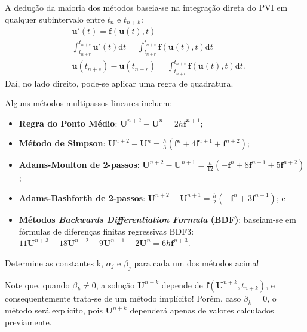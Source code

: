 \documentclass[../differential_methods.tex]{subfiles}
\begin{document}
A dedução da maioria dos métodos baseia-se na integração direta do PVI em qualquer subintervalo entre \(t_{n}\) e \(t_{n+k}\):
\begin{align*}
	 & \mathbf{u}'(t) = \mathbf{f}(\mathbf{u}(t), t)                                                                         \\
	 & \int_{t_{n+r}}^{t_{n+s}}\mathbf{u}'(t) \mathrm{d}t = \int_{t_{n+r}}^{t_{n+s}}\mathbf{f}(\mathbf{u}(t), t) \mathrm{d}t \\
	 & \mathbf{u}(t_{n+s}) - \mathbf{u}(t_{n+r}) = \int_{t_{n+r}}^{t_{n+s}}\mathbf{f}(\mathbf{u}(t), t) \mathrm{d}t.
\end{align*}
Daí, no lado direito, pode-se aplicar uma regra de quadratura.
\begin{example}
	Alguns métodos multipassos lineares incluem:
	\begin{itemize}
		\item \textbf{Regra do Ponto Médio}: \(\mathbf{U}^{n+2} - \mathbf{U}^{n} = 2h \mathbf{f}^{n+1}\);
		\item \textbf{Método de Simpson}: \(\displaystyle \mathbf{U}^{n+2} - \mathbf{U}^{n} = \frac{h}{3}(\mathbf{f}^{n} + 4 \mathbf{f}^{n+1} + \mathbf{f}^{n+2})\);
		\item \textbf{Adams-Moulton de 2-passos}: \(\displaystyle \mathbf{U}^{n+2} - \mathbf{U}^{n+1} = \frac{h}{12}(-\mathbf{f}^{n} + 8 \mathbf{f}^{n+1} + 5 \mathbf{f}^{n+2})\);
		\item \textbf{Adams-Bashforth de 2-passos}: \(\displaystyle \mathbf{U}^{n+2} - \mathbf{U}^{n+1} = \frac{h}{2}(-\mathbf{f}^{n} + 3 \mathbf{f}^{n+1})\); e
		\item \textbf{Métodos \textit{Backwards Differentiation Formula} (BDF)}: baseiam-se em fórmulas de diferenças finitas regressivas BDF3: \(11 \mathbf{U}^{n+3} -18 \mathbf{U}^{n+2} + 9 \mathbf{U}^{n+1} - 2 \mathbf{U}^{n} = 6h \mathbf{f}^{n+3}\).
	\end{itemize}
\end{example}
\begin{exr}
	Determine as constantes k, \(\alpha_{j}\) e \(\beta_{j}\) para cada um dos métodos acima!
\end{exr}

\begin{tcolorbox}[
		skin=enhanced,
		title=Observação,
		fonttitle=\bfseries,
		colframe=black,
		colbacktitle=cyan!75!white,
		colback=cyan!15,
		colbacklower=black,
		coltitle=black,
		drop fuzzy shadow,
	]
	Note que, quando \(\beta_{k} \neq 0\), a solução \(\mathbf{U}^{n+k}\) depende de \(\mathbf{f}(\mathbf{U}^{n+k}, t_{n+k})\), e consequentemente trata-se de um método implícito! Porém, caso \(\beta_{k}=0\), o método será explícito, pois \(\mathbf{U}^{n+k}\) dependerá apenas de valores calculados previamente.
\end{tcolorbox}
\end{document}
